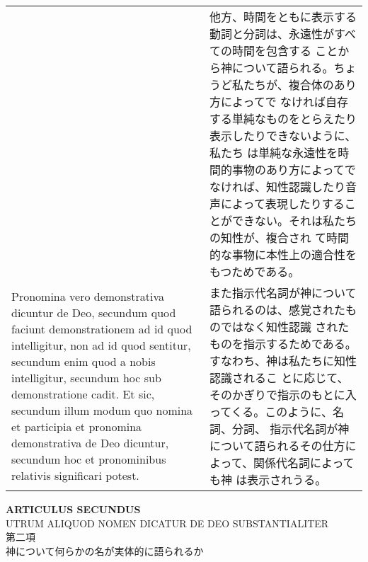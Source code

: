 \documentclass[10pt]{jsarticle}
\begin{document}
\begin{longtable}{p{21em}p{21em}}
&

他方、時間をともに表示する動詞と分詞は、永遠性がすべての時間を包含する
ことから神について語られる。ちょうど私たちが、複合体のあり方によってで
なければ自存する単純なものをとらえたり表示したりできないように、私たち
は単純な永遠性を時間的事物のあり方によってでなければ、知性認識したり音
声によって表現したりすることができない。それは私たちの知性が、複合され
て時間的な事物に本性上の適合性をもつためである。

\\

Pronomina vero demonstrativa dicuntur de Deo, secundum quod faciunt
demonstrationem ad id quod intelligitur, non ad id quod sentitur,
secundum enim quod a nobis intelligitur, secundum hoc sub
demonstratione cadit. Et sic, secundum illum modum quo nomina et
participia et pronomina demonstrativa de Deo dicuntur, secundum hoc et
pronominibus relativis significari potest.

&

また指示代名詞が神について語られるのは、感覚されたものではなく知性認識
されたものを指示するためである。すなわち、神は私たちに知性認識されるこ
とに応じて、そのかぎりで指示のもとに入ってくる。このように、名詞、分詞、
指示代名詞が神について語られるその仕方によって、関係代名詞によっても神
は表示されうる。

\end{longtable}

\newpage
{}

\begin{center}
{\Large {\bf ARTICULUS SECUNDUS}}\\
{\large UTRUM ALIQUOD NOMEN DICATUR DE DEO SUBSTANTIALITER\\
第二項\\
神について何らかの名が実体的に語られるか}
\end{center}
\end{document}

